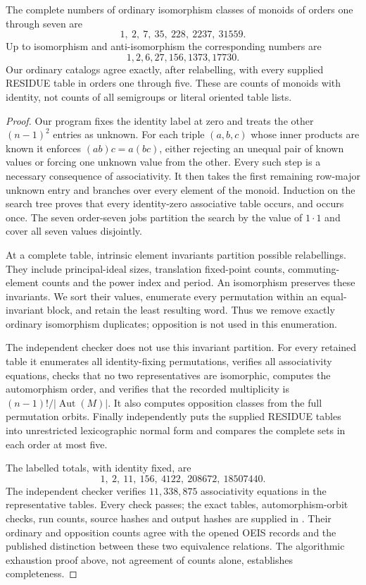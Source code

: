 \begin{theorem}
\label{CP2:A-monoid-census}
The complete numbers of ordinary isomorphism classes of monoids of
orders one through seven are
\[
1,\ 2,\ 7,\ 35,\ 228,\ 2237,\ 31559.
\]
Up to isomorphism and anti-isomorphism the corresponding numbers are
\[1,2,6,27,156,1373,17730.\]
Our ordinary catalogs agree exactly,
after relabelling, with every supplied RESIDUE table in orders
one through five. These are counts of monoids with identity,
not counts of all semigroups or literal oriented table lists.
\end{theorem}
\begin{proof}
Our program  fixes the identity label
at zero and treats the other $(n-1)^2$ entries as unknown.
For each triple $(a,b,c)$ whose inner products are known it
enforces $(ab)c=a(bc)$, either rejecting an unequal pair of
known values or forcing one unknown value from the other.
Every such step is a necessary consequence of associativity.
It then takes the first remaining row-major unknown entry and
branches over every element of the monoid. Induction on the
search tree proves that every identity-zero associative table
occurs, and occurs once. The seven order-seven jobs partition
the search by the value of $1\cdot1$ and cover all seven
values disjointly.

At a complete table, intrinsic element invariants partition
possible relabellings. They include principal-ideal sizes,
translation fixed-point counts, commuting-element counts and
the power index and period. An isomorphism preserves these
invariants. We sort their values, enumerate every permutation
within an equal-invariant block, and retain the least resulting
word. Thus we remove exactly ordinary isomorphism duplicates;
opposition is not used in this enumeration.

The independent checker 
does not use this invariant partition. For every retained
table it enumerates all identity-fixing permutations, verifies
all associativity equations, checks that no two representatives
are isomorphic, computes the automorphism order, and verifies
that the recorded multiplicity is
$(n-1)!/|\operatorname{Aut}(M)|$. It also computes opposition
classes from the full permutation orbits. Finally
 independently puts the supplied
RESIDUE tables into unrestricted lexicographic normal form and
compares the complete sets in each order at most five.

The labelled totals, with identity fixed, are
\[
1,\ 2,\ 11,\ 156,\ 4122,\ 208672,\ 18507440.
\]
The independent checker verifies $11,338,875$ associativity
equations in the representative tables. Every check passes;
the exact tables, automorphism-orbit checks, run counts,
source hashes and output hashes are supplied in
. Their ordinary and opposition
counts agree with the opened OEIS records
\cite{OEIS_A058129,OEIS_A058133} and the published distinction
between these two equivalence relations. The algorithmic
exhaustion proof above, not agreement of counts alone,
establishes completeness.
\end{proof}

